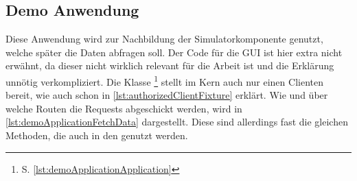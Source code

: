 \subsection{Demo Anwendung}\label{subsec:demo-anwendung}
	Diese Anwendung wird zur Nachbildung der Simulatorkomponente genutzt,
	welche später die Daten abfragen soll.
	Der Code für die GUI ist hier extra nicht erwähnt,
	da dieser nicht wirklich relevant für die Arbeit ist
	und die Erklärung unnötig verkompliziert.
	Die Klasse \footnote{S. \vref{lst:demoApplicationApplication}}
	stellt im Kern auch nur einen  Clienten bereit,
	wie auch schon in \vref{lst:authorizedClientFixture} erklärt.
	Wie und über welche Routen die Requests abgeschickt werden,
	wird in \vref{lst:demoApplicationFetchData} dargestellt.
	Diese sind allerdings fast die gleichen Methoden,
	die auch in den  genutzt werden.
